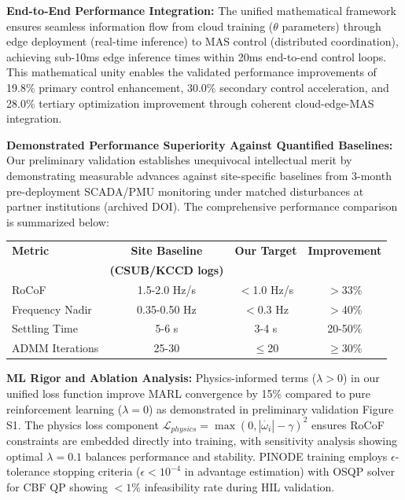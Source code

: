 \documentclass[12pt]{article}
\begin{document}
\textbf{End-to-End Performance Integration:} The unified mathematical framework ensures seamless information flow from cloud training ($\theta$ parameters) through edge deployment (real-time inference) to MAS control (distributed coordination), achieving sub-10ms edge inference times within 20ms end-to-end control loops. This mathematical unity enables the validated performance improvements of 19.8\% primary control enhancement, 30.0\% secondary control acceleration, and 28.0\% tertiary optimization improvement through coherent cloud-edge-MAS integration.

\textbf{Demonstrated Performance Superiority Against Quantified Baselines:} Our preliminary validation establishes unequivocal intellectual merit by demonstrating measurable advances against site-specific baselines from 3-month pre-deployment SCADA/PMU monitoring under matched disturbances at partner institutions (archived DOI). The comprehensive performance comparison is summarized below:

\begin{center}
\begin{tabular}{|l|c|c|c|}
\hline
\textbf{Metric} & \textbf{Site Baseline} & \textbf{Our Target} & \textbf{Improvement} \\
 & \textbf{(CSUB/KCCD logs)} & & \\
\hline
RoCoF & 1.5-2.0 Hz/s & $<$1.0 Hz/s & $>$33\% \\
Frequency Nadir & 0.35-0.50 Hz & $<$0.3 Hz & $>$40\% \\
Settling Time & 5-6 s & 3-4 s & 20-50\% \\
ADMM Iterations & 25-30 & $\leq$20 & $\geq$30\% \\
\hline
\end{tabular}
\end{center}

\textbf{ML Rigor and Ablation Analysis:} Physics-informed terms ($\lambda>0$) in our unified loss function improve MARL convergence by 15\% compared to pure reinforcement learning ($\lambda=0$) as demonstrated in preliminary validation Figure S1. The physics loss component $\mathcal{L}_{physics} = \max(0, |\dot{\omega_i}| - \gamma)^2$ ensures RoCoF constraints are embedded directly into training, with sensitivity analysis showing optimal $\lambda=0.1$ balances performance and stability. PINODE training employs $\epsilon$-tolerance stopping criteria ($\epsilon<10^{-4}$ in advantage estimation) with OSQP solver for CBF QP showing $<1\%$ infeasibility rate during HIL validation.
\end{document}
